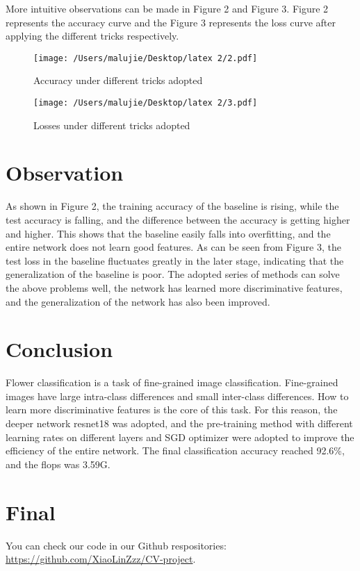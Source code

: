\documentclass[10pt,twocolumn,letterpaper]{article}
\begin{document}
More intuitive observations can be made in Figure 2 and Figure 3. 
Figure 2 represents the accuracy curve and the Figure 3 represents the loss curve after applying the different tricks respectively.

\begin{figure}[htp]
  \centering
   \texttt{[image: /Users/malujie/Desktop/latex 2/2.pdf]}

   \caption{Accuracy under different tricks adopted}
\end{figure}


\begin{figure}[htp]
  \centering
   \texttt{[image: /Users/malujie/Desktop/latex 2/3.pdf]}

   \caption{Losses under different tricks adopted}
\end{figure}

\section{Observation}
As shown in Figure 2, the training accuracy of the baseline is rising, while the test accuracy is falling, and the difference between the accuracy is getting higher and higher. This shows that the baseline easily falls into overfitting, and the entire network does not learn good features. As can be seen from Figure 3, the test loss in the baseline fluctuates greatly in the later stage, indicating that the generalization of the baseline is poor. The adopted series of methods can solve the above problems well, the network has learned more discriminative features, and the generalization of the network has also been improved.

\section{Conclusion}
Flower classification is a task of fine-grained image classification. Fine-grained images have large intra-class differences and small inter-class differences. How to learn more discriminative features is the core of this task. For this reason, the deeper network resnet18 was adopted, and the pre-training method with different learning rates on different layers and SGD optimizer were adopted to improve the efficiency of the entire network. The final classification accuracy reached 92.6\%, and the flops was 3.59G.

\section{Final}
You can check our code in our Github  respositories:
\url{https://github.com/XiaoLinZzz/CV-project}.


{\small


}
\end{document}
